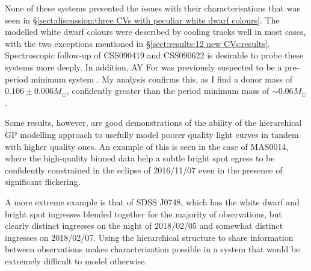 None of these systems presented the issues with their characterisations that was seen in \S\ref{sect:discussion:three CVs with peculiar white dwarf colours}. The modelled white dwarf colours were described by cooling tracks well in most cases, with the two exceptions mentioned in \S\ref{sect:results:12 new CVs:results}. Spectroscopic follow-up of CSS090419 and CSS090622 is desirable to probe these systems more deeply. In addition, AY For was previously suspected to be a pre-period minimum system \citep{mason2005}. My analysis confirms this, as I find a donor mass of $0.106\pm0.006 M_\odot$, confidently greater than the period minimum mass of $\sim0.06 M_\odot$.

Some results, however, are good demonstrations of the ability of the hierarchical GP modelling approach to usefully model poorer quality light curves in tandem with higher quality ones.
An example of this is seen in the case of MAS0014, where the high-quality binned data help a subtle bright spot egress to be confidently constrained in the eclipse of 2016/11/07 even in the presence of significant flickering.

A more extreme example is that of SDSS J0748, which has the white dwarf and bright spot ingresses blended together for the majority of observations, but clearly distinct ingresses on the night of 2018/02/05 and somewhat distinct ingresses on 2018/02/07.
Using the hierarchical structure to share information between observations makes characterisation possible in a system that would be extremely difficult to model otherwise.

